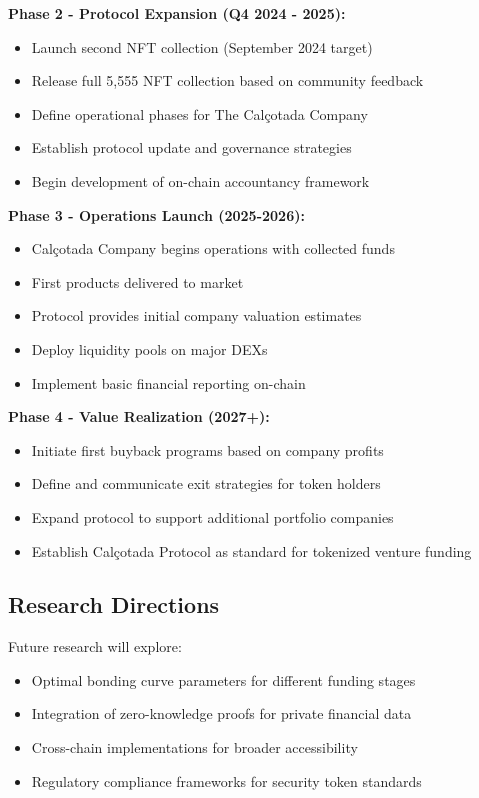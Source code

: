 \documentclass[conference]{IEEEtran}
\begin{document}
\textbf{Phase 2 - Protocol Expansion (Q4 2024 - 2025):}
\begin{itemize}
    \item Launch second NFT collection (September 2024 target)
    \item Release full 5,555 NFT collection based on community feedback
    \item Define operational phases for The Calçotada Company
    \item Establish protocol update and governance strategies
    \item Begin development of on-chain accountancy framework
\end{itemize}

\textbf{Phase 3 - Operations Launch (2025-2026):}
\begin{itemize}
    \item Calçotada Company begins operations with collected funds
    \item First products delivered to market
    \item Protocol provides initial company valuation estimates
    \item Deploy liquidity pools on major DEXs
    \item Implement basic financial reporting on-chain
\end{itemize}

\textbf{Phase 4 - Value Realization (2027+):}
\begin{itemize}
    \item Initiate first buyback programs based on company profits
    \item Define and communicate exit strategies for token holders
    \item Expand protocol to support additional portfolio companies
    \item Establish Calçotada Protocol as standard for tokenized venture funding
\end{itemize}

\subsection{Research Directions}

Future research will explore:
\begin{itemize}
    \item Optimal bonding curve parameters for different funding stages
    \item Integration of zero-knowledge proofs for private financial data
    \item Cross-chain implementations for broader accessibility
    \item Regulatory compliance frameworks for security token standards
\end{itemize}
\end{document}
